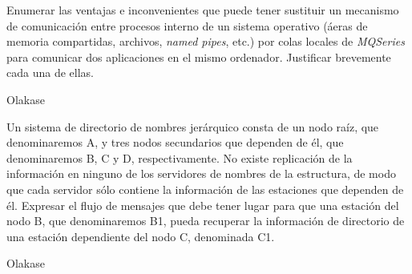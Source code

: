  \begin{problem}
  Enumerar las ventajas e inconvenientes que puede tener sustituir un mecanismo
  de comunicación entre procesos interno de un sistema operativo (áeras
  de memoria compartidas, archivos, \textit{named pipes}, etc.) por colas locales
de \textit{MQSeries} para comunicar dos aplicaciones en el mismo ordenador.
Justificar brevemente cada una de ellas.
  \solution

  Olakase

  \end{problem}

  \begin{problem}
  Un sistema de directorio de nombres jerárquico consta de un nodo raíz, que
denominaremos A, y tres nodos secundarios que dependen de él, que denominaremos
B, C y D, respectivamente. No existe replicación de la información en ninguno
de los servidores de nombres de la estructura, de modo que cada servidor sólo
contiene la información de las estaciones que dependen de él. Expresar el flujo
de mensajes que debe tener lugar para que una estación del nodo B, que
denominaremos B1, pueda recuperar la información de directorio de una estación
dependiente del nodo C, denominada C1.
  \solution

  Olakase

  \end{problem}


